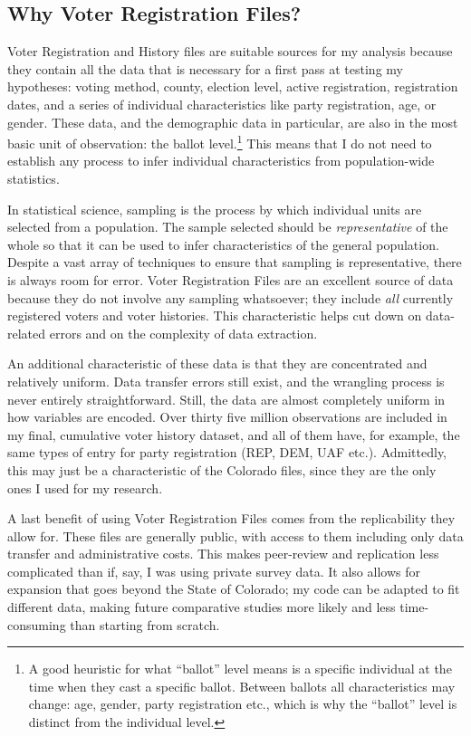 \documentclass[12pt,twoside]{reedthesis}
\begin{document}
  \subsection{Why Voter Registration
  Files?}\label{why-voter-registration-files}
  
  Voter Registration and History files are suitable sources for my
  analysis because they contain all the data that is necessary for a first
  pass at testing my hypotheses: voting method, county, election level,
  active registration, registration dates, and a series of individual
  characteristics like party registration, age, or gender. These data, and
  the demographic data in particular, are also in the most basic unit of
  observation: the ballot level.\footnote{A good heuristic for what
    ``ballot'' level means is a specific individual at the time when they
    cast a specific ballot. Between ballots all characteristics may
    change: age, gender, party registration etc., which is why the
    ``ballot'' level is distinct from the individual level.} This means
  that I do not need to establish any process to infer individual
  characteristics from population-wide statistics.
  
  In statistical science, sampling is the process by which individual
  units are selected from a population. The sample selected should be
  \emph{representative} of the whole so that it can be used to infer
  characteristics of the general population. Despite a vast array of
  techniques to ensure that sampling is representative, there is always
  room for error. Voter Registration Files are an excellent source of data
  because they do not involve any sampling whatsoever; they include
  \emph{all} currently registered voters and voter histories. This
  characteristic helps cut down on data-related errors and on the
  complexity of data extraction.
  
  An additional characteristic of these data is that they are concentrated
  and relatively uniform. Data transfer errors still exist, and the
  wrangling process is never entirely straightforward. Still, the data are
  almost completely uniform in how variables are encoded. Over thirty five
  million observations are included in my final, cumulative voter history
  dataset, and all of them have, for example, the same types of entry for
  party registration (REP, DEM, UAF etc.). Admittedly, this may just be a
  characteristic of the Colorado files, since they are the only ones I
  used for my research.
  
  A last benefit of using Voter Registration Files comes from the
  replicability they allow for. These files are generally public, with
  access to them including only data transfer and administrative costs.
  This makes peer-review and replication less complicated than if, say, I
  was using private survey data. It also allows for expansion that goes
  beyond the State of Colorado; my code can be adapted to fit different
  data, making future comparative studies more likely and less
  time-consuming than starting from scratch.
  
\end{document}
